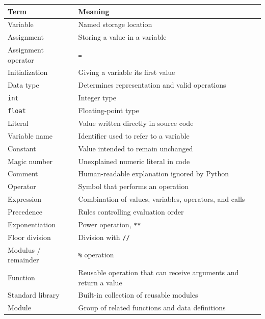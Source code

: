 \documentclass[
]{article}
\newcounter{none} %
\begin{document}
{\def\LTcaptype{none} %
\begin{longtable}[]{@{}
  >{\raggedright\arraybackslash}p{}
  >{\raggedright\arraybackslash}p{}@{}}
\toprule\noalign{}
\begin{minipage}[b]{\linewidth}\raggedright
Term
\end{minipage} & \begin{minipage}[b]{\linewidth}\raggedright
Meaning
\end{minipage} \\
\midrule\noalign{}
\endhead
\bottomrule\noalign{}
\endlastfoot
Variable & Named storage location \\
Assignment & Storing a value in a variable \\
Assignment operator & \texttt{=} \\
Initialization & Giving a variable its first value \\
Data type & Determines representation and valid operations \\
\texttt{int} & Integer type \\
\texttt{float} & Floating-point type \\
Literal & Value written directly in source code \\
Variable name & Identifier used to refer to a variable \\
Constant & Value intended to remain unchanged \\
Magic number & Unexplained numeric literal in code \\
Comment & Human-readable explanation ignored by Python \\
Operator & Symbol that performs an operation \\
Expression & Combination of values, variables, operators, and calls \\
Precedence & Rules controlling evaluation order \\
Exponentiation & Power operation, \texttt{**} \\
Floor division & Division with \texttt{//} \\
Modulus / remainder & \texttt{\%} operation \\
Function & Reusable operation that can receive arguments and return a
value \\
Standard library & Built-in collection of reusable modules \\
Module & Group of related functions and data definitions \\

\end{longtable}}
\end{document}
